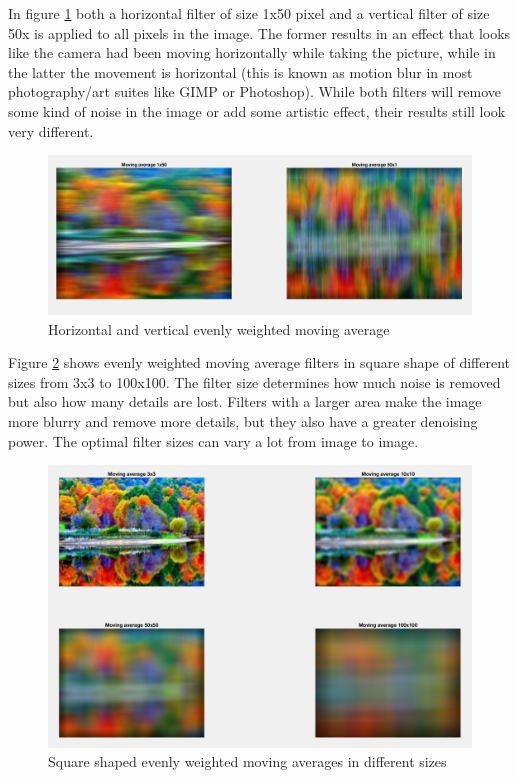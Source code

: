 In figure \ref{fig:task9} both a horizontal filter of size 1x50 pixel and a vertical filter of size 50x is applied to all pixels in the image. The former results in an effect that looks like the camera had been moving horizontally while taking the picture, while in the latter the movement is horizontal (this is known as motion blur in most photography/art suites like GIMP or Photoshop). While both filters will remove some kind of noise in the image or add some artistic effect, their results still look very different. 

\begin{figure}[!hbt]
  \includegraphics[width=\textwidth]{./img/task9.png}
  \caption{Horizontal and vertical evenly weighted moving average}
  \label{fig:task9}
\end{figure}

Figure \ref{fig:task10} shows evenly weighted moving average filters in square shape of different sizes from 3x3 to 100x100. The filter size determines how much noise is removed but also how many details are lost. Filters with a larger area make the image more blurry and remove more details, but they also have a greater denoising power. The optimal filter sizes can vary a lot from image to image.

\begin{figure}[!hbt]
  \includegraphics[width=\textwidth]{./img/task10.png}
  \caption{Square shaped evenly weighted moving averages in different sizes}
  \label{fig:task10}
\end{figure}

